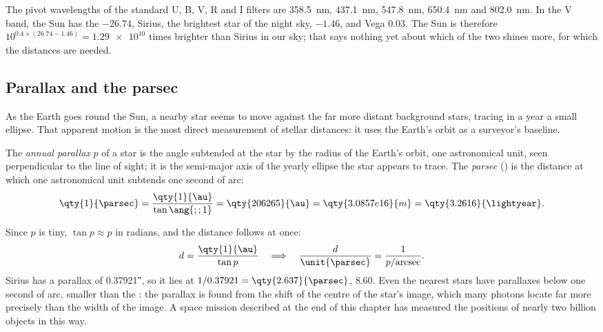 The pivot wavelengths of the standard U, B, V, R and I filters are
\qty{358.5}{nm}, \qty{437.1}{nm}, \qty{547.8}{nm}, \qty{650.4}{nm} and
\qty{802.0}{nm}.
In the V band, the Sun has the  $-26.74$, Sirius, the
brightest star of the night sky, $-1.46$, and Vega $0.03$. The Sun is
therefore $10^{0.4\times(26.74 - 1.46)} = \num{1.29e10}$ times brighter than
Sirius in our sky; that says nothing yet about which of the two shines more,
for which the distances are needed.

\subsection*{Parallax and the parsec}

As the Earth goes round the Sun, a nearby star seems to move against the
far more distant background stars, tracing in a year a small ellipse. That
apparent motion is the most direct measurement of stellar distances: it
uses the Earth's orbit as a surveyor's baseline.

\begin{definition}\label{def:b1:observing-the-sky:parallax}
The \emph{annual parallax} $p$ of a star is the angle
subtended at the star by the radius of the Earth's orbit, one astronomical
unit, seen perpendicular to the line of sight; it is the semi-major axis of
the yearly ellipse the star appears to trace. The
\emph{parsec} (\unit{\parsec}) is the distance at which one
astronomical unit subtends one second of arc:
\[
  \qty{1}{\parsec} = \frac{\qty{1}{\au}}{\tan\ang{;;1}} = \qty{206265}{\au}
  = \qty{3.0857e16}{m} = \qty{3.2616}{\lightyear} .
\]
\end{definition}

Since $p$ is tiny, $\tan p \approx p$ in radians, and the distance follows
at once:
\[
  d = \frac{\qty{1}{\au}}{\tan p} \quad\Longrightarrow\quad
  \frac{d}{\unit{\parsec}} = \frac{1}{p/\text{arcsec}} .
\]
Sirius has a parallax of \ang{;;0.37921}, so it lies at $1/0.37921 =
\qty{2.637}{\parsec}$, \qty{8.60}{\lightyear}. Even the nearest stars have
parallaxes below one second of arc, smaller than the : the parallax
is found from the shift of the centre of the star's image, which many
photons locate far more precisely than the width of the image. A space
mission described at the end of this chapter has measured the positions of
nearly two billion objects in this way.

